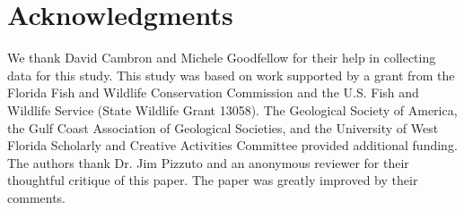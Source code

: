 \documentclass[preprint, review, authoryear, 12pt]{elsarticle}
\begin{document}
\section{Acknowledgments}
We thank David Cambron and Michele Goodfellow for their help in collecting data for this study. This study was based on work supported by a grant from the Florida Fish and Wildlife Conservation Commission and the U.S. Fish and Wildlife Service (State Wildlife Grant 13058). The Geological Society of America, the Gulf Coast Association of Geological Societies, and the University of West Florida Scholarly and Creative Activities Committee provided additional funding. The authors thank Dr. Jim Pizzuto and an anonymous reviewer for their thoughtful critique of this paper. The paper was greatly improved by their comments.

 

\end{document}
